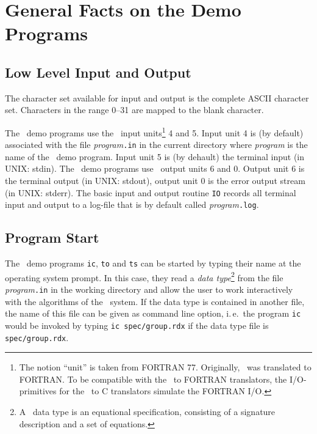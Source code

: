\section{General Facts on the Demo Programs}
\subsection{Low Level Input and Output}
The character set available for input and output is the complete ASCII
character set. Characters in the range 0--31 are mapped to the
blank character.

The \redux\  demo programs use the \ALDES\ input units\footnote{The notion
``unit'' is taken from FORTRAN 77.
Originally, \ALDES\ was translated to FORTRAN.
To be compatible with the \ALDES\ to FORTRAN translators, the
I/O-primitives for the \ALDES\ to C translators simulate the
FORTRAN I/O.}
4 and 5. 
Input unit 4 is (by default) associated with the file 
{\it program}{\tt .in} in the current directory 
 where {\it program} is the name of
the \redux\  demo program.
Input unit 5 is (by dehault) the terminal input (in UNIX: stdin).
The \redux\  demo programs use \ALDES\ output units 6 and 0.
Output unit 6 is the terminal output (in UNIX: stdout),
output unit 0 is the error output stream (in UNIX: stderr).
The basic input and output routine {\tt IO} records
all terminal input and output to a log-file that is by default called
{\it program}{\tt .log}.

\subsection{Program Start}
\label{GeneralProgramStart}
The \redux\  demo programs {\tt ic}, {\tt to} and {\tt ts}
can be started by typing their name at the 
operating system prompt. 
In this case,  they read a {\em data type}\/\footnote{
A \redux\  data type is an equational specification, consisting of a
signature description and a set of equations.}
from the file {\it program}{\tt .in} in the working
directory and allow the user to work interactively with the 
algorithms of the \redux\  system. 
If the data type is contained in another file, the name of this file can be
given as command line option, i.\,e.\ the program {\tt ic} would
be invoked by typing {\tt ic spec/group.rdx} if the data type
file is {\tt spec/group.rdx}.

